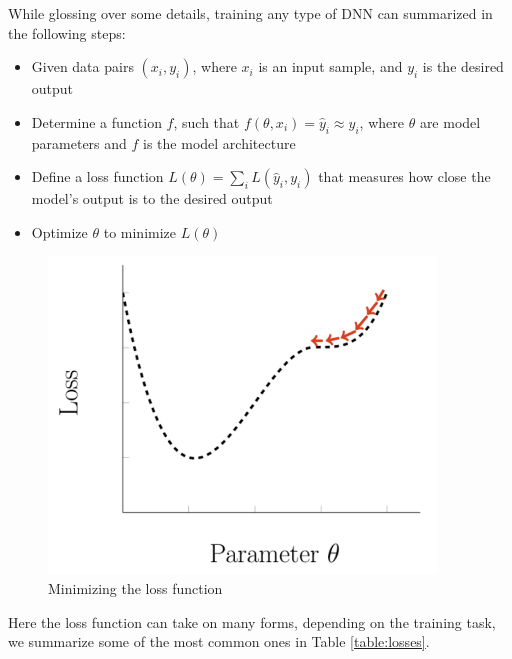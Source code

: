 While glossing over some details, training any type of DNN can summarized in the following steps:
\begin{itemize}
    \item Given data pairs $(x_i, y_i)$, where $x_i$ is an input sample, and $y_i$ is the desired output
    \item Determine a function $f$, such that $f(\theta, x_i) = \hat{y}_i \approx y_i$, where $\theta$ are model parameters and $f$ is the model architecture
    \item Define a loss function $L(\theta) = \sum_i L(\hat{y}_i, y_i)$ that measures how close the model's output is to the desired output
    \item Optimize $\theta$ to minimize $L(\theta)$
\end{itemize}
\begin{figure}[h]
    \includegraphics[width=\linewidth]{chapters/NLP/figures/loss.png}
    \caption{Minimizing the loss function}
    \label{fig:loss}
\end{figure}
Here the loss function can take on many forms, depending on the training task, we summarize some of the most common ones in Table \ref{table:losses}.
